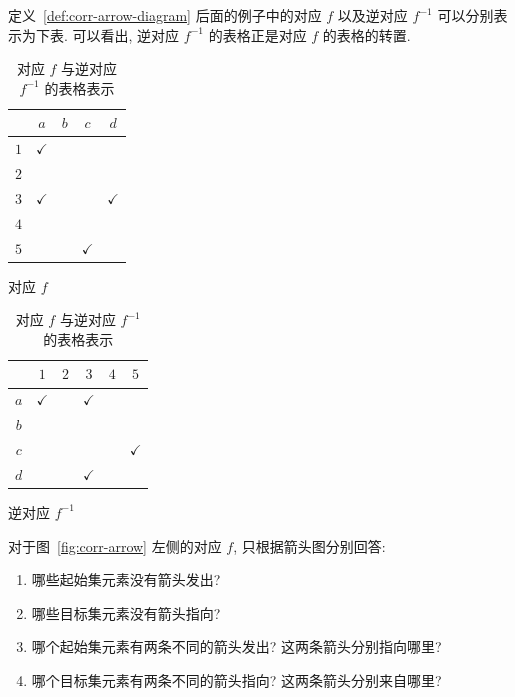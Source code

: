 \documentclass[usesamecnt, thmcnt=section, lang=cn, newtx, 10pt, scheme=chinese]{elegantbook}
\begin{document}
\begin{instance}
定义~\ref{def:corr-arrow-diagram} 后面的例子中的对应 $f$ 以及逆对应 $f^{-1}$ 可以分别表示为下表. 可以看出, 逆对应 $f^{-1}$ 的表格正是对应 $f$ 的表格的转置.
\begin{table}[H]
\centering
\begin{minipage}{0.47\textwidth}
\centering
\begin{tabular}{|c|c|c|c|c|}
\hline
 & $a$ & $b$ & $c$ & $d$\\
\hline
$1$ & $\checkmark$ & & & \\
\hline
$2$ & & & & \\
\hline
$3$ & $\checkmark$ & & & $\checkmark$\\
\hline
$4$ & & & & \\
\hline
$5$ & & & $\checkmark$ & \\
\hline
\end{tabular}

\small 对应 $f$
\end{minipage}
\hfill
\begin{minipage}{0.47\textwidth}
\centering
\begin{tabular}{|c|c|c|c|c|c|}
\hline
 & $1$ & $2$ & $3$ & $4$ & $5$\\
\hline
$a$ & $\checkmark$ & & $\checkmark$ & & \\
\hline
$b$ & & & & & \\
\hline
$c$ & & & & & $\checkmark$\\
\hline
$d$ & & & $\checkmark$ & & \\
\hline
\end{tabular}

\small 逆对应 $f^{-1}$
\end{minipage}
\caption{对应 $f$ 与逆对应 $f^{-1}$ 的表格表示}
\label{tab:corr-table}
\end{table}
\end{instance}

\begin{concept}\label{con:corr-03}
对于图~\ref{fig:corr-arrow} 左侧的对应 $f$, 只根据箭头图分别回答:
\begin{enumerate}[label=\rm(\arabic*)]
  \item 哪些起始集元素没有箭头发出?
  \item 哪些目标集元素没有箭头指向?
  \item 哪个起始集元素有两条不同的箭头发出? 这两条箭头分别指向哪里?
  \item 哪个目标集元素有两条不同的箭头指向? 这两条箭头分别来自哪里?
\end{enumerate}
\end{concept}
\end{document}
